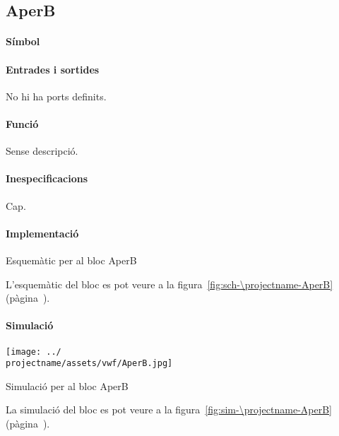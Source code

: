 \subsection{\label{sub:\projectname-AperB} \textsf{AperB}}

\paragraph{Símbol}

\begin{center}  \end{center}

\paragraph{Entrades i sortides}

No hi ha ports definits.

\paragraph{Funció}

Sense descripció.

\paragraph{Inespecificacions}

Cap.

\paragraph{Implementació}


\begin{contendfig}
  \begin{center}
  \end{center}
  \caption{\label{fig:sch-\projectname-AperB} Esquemàtic per al bloc \textsf{AperB}}
\end{contendfig}

L'esquemàtic del bloc es pot veure a la figura~\ref{fig:sch-\projectname-AperB} (pàgina~\pageref{fig:sch-\projectname-AperB}).


\paragraph{Simulació}

\begin{contendfig}
  \begin{center}
    \texttt{[image: ../\\projectname/assets/vwf/AperB.jpg]}
  \end{center}
  \caption{\label{fig:sim-\projectname-AperB} Simulació per al bloc \textsf{AperB}}
\end{contendfig}

La simulació del bloc es pot veure a la figura~\ref{fig:sim-\projectname-AperB} (pàgina~\pageref{fig:sim-\projectname-AperB}).


\vspace{1cm}

